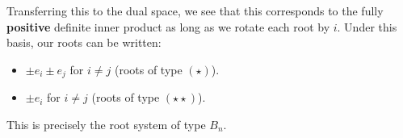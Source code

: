 \documentclass[11pt, headheight=30pt]{scrartcl}
\begin{document}
Transferring this to the dual space, we see that this
corresponds to the fully \textbf{positive} definite inner product
as long as we rotate each root by $i$. Under this basis,
our roots can be written:
\begin{itemize}
    \item $\pm e_i \pm e_j$ for $i\neq j$ (roots of type $(\star)$).
    \item $\pm e_i$ for $i\neq j$ (roots of type $(\star\star)$).
\end{itemize}

This is precisely the root system of type $B_n$.
\end{document}
